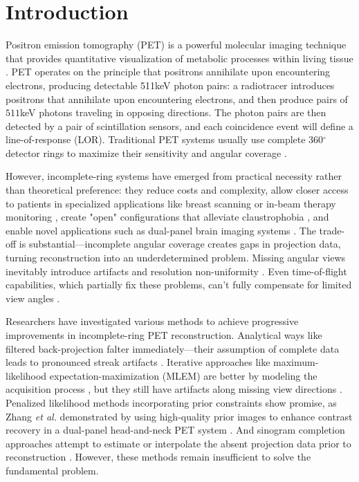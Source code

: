 \documentclass[aps,prb,preprint,groupedaddress,showkeys]{revtex4}
\begin{document}

\section{Introduction}
\label{chap:introduction}

Positron emission tomography (PET) is a powerful molecular imaging technique that provides quantitative visualization of metabolic processes within living tissue \cite{townsend2004, muehllehner2006positron, lameka2016positron, shukla2006positron, nutt2002history}. PET operates on the principle that positrons annihilate upon encountering electrons, producing detectable 511keV photon pairs: a radiotracer introduces positrons that annihilate upon encountering electrons, and then produce pairs of $511$keV photons traveling in opposing directions. 
The photon pairs are then detected by a pair of scintillation sensors, and each coincidence event will define a line-of-response (LOR).
Traditional PET systems usually use complete 360$^\circ$ detector rings to maximize their sensitivity and angular coverage \cite{townsend2004}.

However, incomplete-ring systems have emerged from practical necessity rather than theoretical preference: they reduce costs and complexity, allow closer access to patients in specialized applications like breast scanning or in-beam therapy monitoring \cite{surti2008}, create "open" configurations that alleviate claustrophobia \cite{tashima2012, krishnamoorthy2021}, and enable novel applications such as dual-panel brain imaging systems \cite{zhang2020}. The trade-off is substantial—incomplete angular coverage creates gaps in projection data, turning reconstruction into an underdetermined problem. Missing angular views inevitably introduce artifacts and resolution non-uniformity \cite{kak1988, surti2008}. Even time-of-flight capabilities, which partially fix these problems, can't fully compensate for limited view angles \cite{surti2008, krishnamoorthy2021}.

Researchers have investigated various methods to achieve progressive improvements in incomplete-ring PET reconstruction. Analytical ways like filtered back-projection falter immediately—their assumption of complete data leads to pronounced streak artifacts \cite{kak1988}. Iterative approaches like maximum-likelihood expectation-maximization (MLEM) are better by modeling the acquisition process \cite{qi2006}, but they still have artifacts along missing view directions \cite{zhang2020}.
Penalized likelihood methods incorporating prior constraints show promise, as Zhang \textit{et al.} demonstrated by using high-quality prior images to enhance contrast recovery in a dual-panel head-and-neck PET system \cite{zhang2020}. And sinogram completion approaches attempt to estimate or interpolate the absent projection data prior to reconstruction \cite{makkar2024partial}. However, these methods remain insufficient to solve the fundamental problem. 
\end{document}
